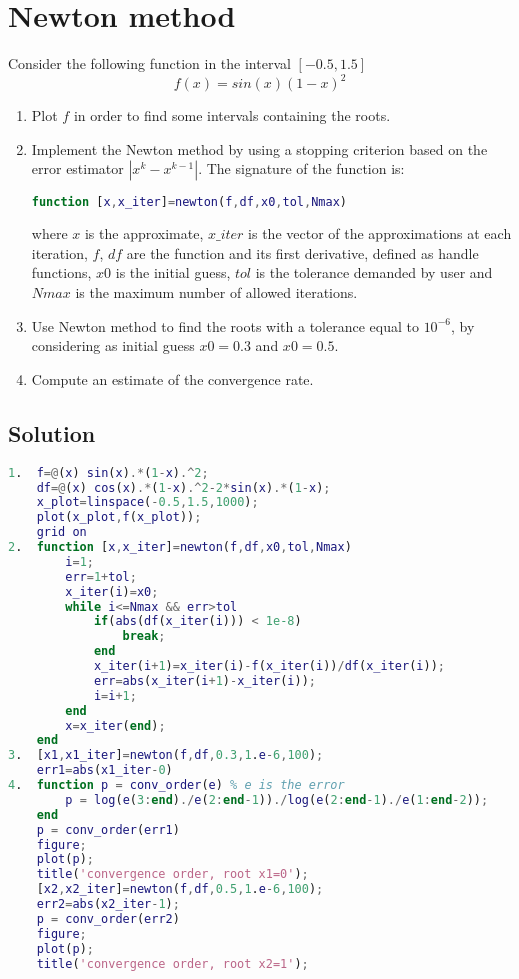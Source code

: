 \documentclass[12pt, a4paper]{report}
\begin{document}
    \newpage

    \section{Newton method}
        Consider the following function in the interval $[-0.5, 1.5]$
        \[f (x) = sin(x)(1 - x)^2\]
        \begin{enumerate}
            \item Plot $f$ in order to find some intervals containing the roots. 
            \item Implement the Newton method by using a stopping criterion based on the error estimator $\left\lvert x^k - x^{k-1}\right\rvert$. The signature of the function is:
                \begin{lstlisting}[language=Matlab]
function [x,x_iter]=newton(f,df,x0,tol,Nmax)
                \end{lstlisting}  
                where $x$ is the approximate, $x\_iter$ is the vector of the approximations at each iteration, $f$, $df$ are the function and its first derivative, defined as
                handle functions, $x0$ is the initial guess, $tol$ is the tolerance demanded by user and $Nmax$ is the maximum number of allowed iterations.
            \item Use Newton method to find the roots with a tolerance equal to $10^{-6}$, by considering as initial guess $x0 = 0.3$ and $x0 = 0.5$.
            \item Compute an estimate of the convergence rate. 
        \end{enumerate}
    \subsection*{Solution}
        \begin{lstlisting}[language=Matlab]
1.  f=@(x) sin(x).*(1-x).^2;
    df=@(x) cos(x).*(1-x).^2-2*sin(x).*(1-x);
    x_plot=linspace(-0.5,1.5,1000);
    plot(x_plot,f(x_plot));
    grid on
2.  function [x,x_iter]=newton(f,df,x0,tol,Nmax)
        i=1;
        err=1+tol;
        x_iter(i)=x0;
        while i<=Nmax && err>tol
            if(abs(df(x_iter(i))) < 1e-8) 
                break;
            end
            x_iter(i+1)=x_iter(i)-f(x_iter(i))/df(x_iter(i));
            err=abs(x_iter(i+1)-x_iter(i));
            i=i+1;
        end
        x=x_iter(end);
    end
3.  [x1,x1_iter]=newton(f,df,0.3,1.e-6,100);
    err1=abs(x1_iter-0)
4.  function p = conv_order(e) % e is the error
        p = log(e(3:end)./e(2:end-1))./log(e(2:end-1)./e(1:end-2));
    end
    p = conv_order(err1)
    figure;
    plot(p);
    title('convergence order, root x1=0');
    [x2,x2_iter]=newton(f,df,0.5,1.e-6,100);
    err2=abs(x2_iter-1);
    p = conv_order(err2)
    figure;
    plot(p);
    title('convergence order, root x2=1');
        \end{lstlisting}  
\end{document}

